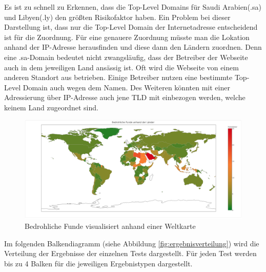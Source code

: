 Es ist zu schnell zu Erkennen, dass die Top-Level Domains für Saudi Arabien(.sa) und Libyen(.ly) den größten Risikofaktor haben. Ein Problem bei dieser Darstellung ist, dass nur die Top-Level Domain der Internetadresse entscheidend ist für die Zuordnung. Für eine genauere Zuordnung müsste man die Lokation anhand der IP-Adresse herausfinden und diese dann den Ländern zuordnen. Denn eine .sa-Domain bedeutet nicht zwangsläufig, dass der Betreiber der Webseite auch in dem jeweiligen Land ansässig ist. Oft wird die Webseite von einem anderen Standort aus betrieben. Einige Betreiber nutzen eine bestimmte Top-Level Domain auch wegen dem Namen. Des Weiteren könnten mit einer Adressierung über IP-Adresse auch jene \ac{TLD} mit einbezogen werden, welche keinem Land zugeordnet sind.

\begin{figure}[H]
  \centering
  \includegraphics[width=15cm]{images/stats/weltkarte}
  \caption{Bedrohliche Funde visualisiert anhand einer Weltkarte\protect\footnotemark}
  \label{fig:weltkarte}
\end{figure}

Im folgenden Balkendiagramm (siehe Abbildung \ref{fig:ergebnisverteilung}) wird die Verteilung der Ergebnisse der einzelnen Tests dargestellt. Für jeden Test werden bis zu 4 Balken für die jeweiligen Ergebnistypen dargestellt.

